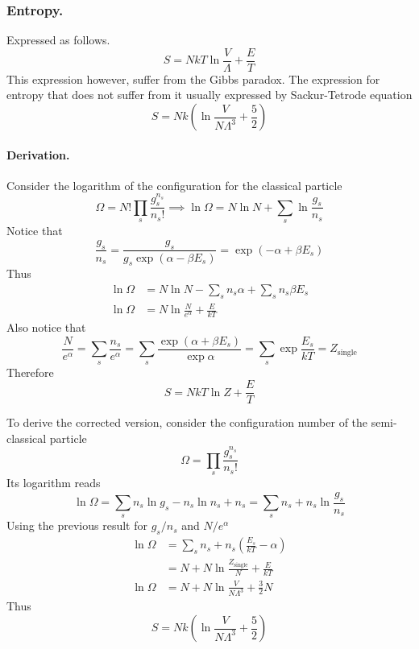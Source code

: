 \documentclass[../../../Main.tex]{subfiles}
\begin{document}
\subsubsection*{Entropy.} Expressed as follows.
\begin{equation*}
	S=NkT\ln \frac{V}{\Lambda}+\frac{E}{T}
\end{equation*}
This expression however, suffer from the Gibbs paradox. The expression for entropy that does not suffer from it usually expressed by Sackur-Tetrode equation
\begin{equation*}
	S=Nk\left(\ln\frac{V}{N\Lambda^3}+\frac{5}{2}\right)
\end{equation*}

\paragraph*{Derivation.} Consider the logarithm of the configuration for the classical particle
\begin{equation*}
	\Omega=N!\prod_s \frac{g_s^{n_s}}{n_s!}\implies
	\ln \Omega=N\ln N +\sum_s\ln\frac{g_s}{n_s}
\end{equation*}
Notice that
\begin{equation*}
	\frac{g_s}{n_s}=\frac{g_s}{g_s\exp(\alpha-\beta E_s)}=\exp(-\alpha+\beta E_s)
\end{equation*}
Thus
\begin{align*}
	\ln \Omega & =N\ln N -\sum_sn_s\alpha +\sum_sn_s\beta E_s \\
	\ln\Omega  & = N\ln \frac{N}{e^\alpha}+\frac{E}{kT}
\end{align*}
Also notice that
\begin{equation*}
	\frac{N}{e^\alpha}=\sum_s\frac{n_s}{e^\alpha}=\sum_s\frac{\exp(\alpha+\beta E_s)}{\exp\alpha}=\sum_s\exp \frac{E_s}{kT}=Z_\text{single}
\end{equation*}
Therefore
\begin{equation*}
	S=NkT\ln Z+\frac{E}{T}
\end{equation*}

To derive the corrected version, consider the configuration number of the semi-classical particle
\begin{equation*}
	\Omega=\prod_s \frac{g_s^{n_s}}{n_s!}
\end{equation*}
Its logarithm reads
\begin{equation*}
	\ln \Omega=\sum_s n_s\ln g_s-n_s\ln n_s +n_s=\sum_s n_s+n_s\ln\frac{g_s}{n_s}
\end{equation*}
Using the previous result for $g_s/n_s$ and $N/e^\alpha$
\begin{align*}
	\ln \Omega & = \sum_s n_s+n_s\left(\frac{E_s}{kT}-\alpha\right) \\
	           & = N+ N\ln\frac{Z_\text{single}}{N}+\frac{E}{kT}    \\
	\ln \Omega & = N+ N\ln\frac{V}{N\Lambda^3}+\frac{3}{2}N
\end{align*}
Thus
\begin{equation*}
	S=Nk\left(\ln\frac{V}{N\Lambda^3}+\frac{5}{2}\right)
\end{equation*}
\end{document}
